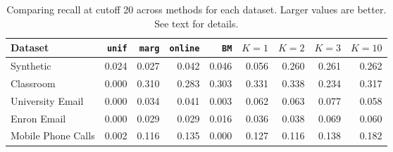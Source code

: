\begin{table}[t]
\begin{center}
{\footnotesize
\begin{tabular}{lrrrrrrrr}
  \hline
Dataset & \texttt{unif} & \texttt{marg} & \texttt{online} & \texttt{BM} & $K=1$ & $K=2$ & $K=3$ & $K=10$ \\ 
  \hline
Synthetic & 0.024 & 0.027 & 0.042 & 0.046 & 0.056 & 0.260 & 0.261 & 0.262 \\ 
  Classroom & 0.000 & 0.310 & 0.283 & 0.303 & 0.331 & 0.338 & 0.234 & 0.317 \\ 
  University Email & 0.000 & 0.034 & 0.041 & 0.003 & 0.062 & 0.063 & 0.077 & 0.058 \\ 
  Enron Email & 0.000 & 0.029 & 0.029 & 0.016 & 0.036 & 0.038 & 0.069 & 0.060 \\ 
  Mobile Phone Calls & 0.002 & 0.116 & 0.135 & 0.000 & 0.127 & 0.116 & 0.138 & 0.182 \\ 
   \hline
\end{tabular}
}
\caption{Comparing recall at cutoff 20 across methods for each dataset.  Larger values are better.  See text for details.}
\label{tab:recall20}
\end{center}
\end{table}
